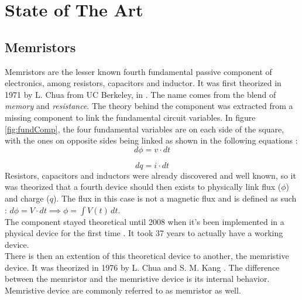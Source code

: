 \section{State of The Art}
\label{sec:int_state}

\subsection{Memristors}\label{subsec:memristors}

Memristors are the lesser known fourth fundamental passive component of electronics, among resistors, capacitors and inductor.
It was first theorized in 1971 by L. Chua from UC Berkeley, in \cite{TheoMemristor}. The name comes from the blend of \textit{memory} and \textit{resistance}.
The theory behind the component was extracted from a missing component to link the fundamental circuit variables. In figure \ref{fig:fundComp}, the four fundamental variables are on each side of the square, with the ones on opposite sides being linked as shown in the following equations :
\begin{equation}
  d\phi = v\cdot dt
\end{equation}

\begin{equation}
  dq = i\cdot dt
\end{equation}
Resistors, capacitors and inductors were already discovered and well known, so it was theorized that a fourth device should then exists to physically link flux ($\phi$) and charge ($q$).  The flux in this case is not a magnetic flux and is defined as such : $ d\phi=V\cdot dt \implies \phi =  \int V(t) \,dt  $.\\
The component stayed theoretical until 2008 when it's been implemented in a physical device for the first time \cite{Strukov2008}. It took 37 years to actually have a working device.\\
There is then an extention of this theoretical device to another, the memristive device. It was theorized in 1976 by L. Chua and S. M. Kang \cite{memrestiveDev}. The difference between the memristor and the memristive device is its internal behavior. Memristive device are commonly referred to as memristor as well.

